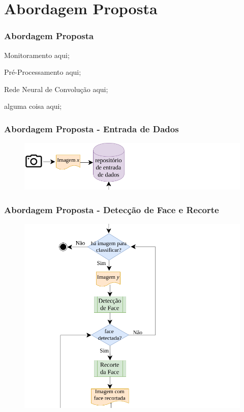 \documentclass{beamer}
\begin{document}
\section{Abordagem Proposta}
\begin{frame}
\frametitle{Abordagem Proposta}
\pause
\begin{block}{Monitoramento}
aqui;
\end{block}
\pause
\begin{block}{Pré-Processamento}
aqui;
\end{block}
\pause
\begin{block}{Rede Neural de Convolução}
aqui;
\end{block}
\begin{block}{alguma coisa}
aqui;
\end{block}

\end{frame}


\begin{frame}
\frametitle{Abordagem Proposta - Entrada de Dados }
\begin{figure}
\centering
\includegraphics[scale=0.37]{figuras/arquitetura_1.png}
\label{fig:arquitetura1}
\end{figure}
\end{frame}

\begin{frame}
\frametitle{Abordagem Proposta - Detecção de Face e Recorte}
\begin{figure}
\centering
\includegraphics[scale=0.27]{figuras/arquitetura_2.png}
\label{fig:arquitetura2}
\end{figure}
\end{frame}
\end{document}
